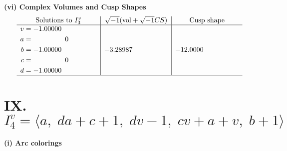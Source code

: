 \documentclass[1p]{elsarticle_modified}
\theoremstyle{definition}
\newcommand{\I}{\sqrt{-1}}
\begin{document}
\newpage\flushleft \textbf{(vi) Complex Volumes and Cusp Shapes}
$$\begin{array}{c|c|c}  
\text{Solutions to }I^v_{3}& \I (\text{vol} + \sqrt{-1}CS) & \text{Cusp shape}\\
 \hline 
\begin{aligned}
v &= -1.00000\phantom{ +0.000000I} \\
a &= \phantom{-0.000000 } 0 \\
b &= -1.00000\phantom{ +0.000000I} \\
c &= \phantom{-0.000000 } 0 \\
d &= -1.00000\phantom{ +0.000000I}\end{aligned}
 & -3.28987\phantom{ +0.000000I} & -12.0000\phantom{ +0.000000I}\\
 \hline 
 \end{array}$$\newpage\newpage\renewcommand{\arraystretch}{1}
\centering \section*{IX. $I^v_{4}= \langle a,\;d a+c+1,\;d v-1,\;c v+a+v,\;b+1 \rangle$}
\flushleft \textbf{(i) Arc colorings}\\
\end{document}
